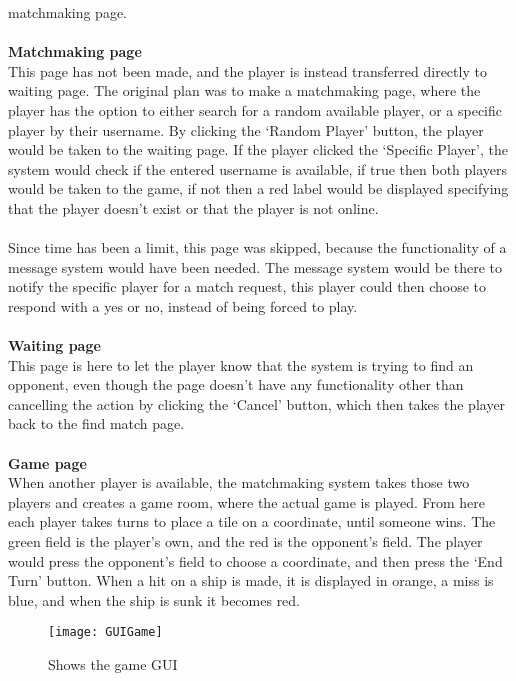 		  matchmaking page.
\\
\\
\textbf{Matchmaking page}
\\
This page has not been made, and the player is instead transferred directly
 to waiting page. The original plan was to make a matchmaking page, where the
  player has the option to either search for a random available player, or a
	 specific player by their username. By clicking the ‘Random Player’ button,
	  the player would be taken to the waiting page. If the player clicked the
		‘Specific Player’, the system would check if the entered username is
		available, if true then both players would be taken to the game, if not
		 then a red label would be displayed specifying that the player doesn’t
		 exist or that the player is not online.
\\
\\
Since time has been a limit, this page was skipped, because the functionality
of a message system would have been needed. The message system would be there
 to notify the specific player for a match request, this player could then
 choose to respond with a yes or no, instead of being forced to play.
\\
\\
\textbf{Waiting page}
\\
This page is here to let the player know that the system is trying to find
an opponent, even though the page doesn’t have any functionality other than
 cancelling the action by clicking the ‘Cancel’ button, which then takes the
  player back to the find match page.
\\
\\
\textbf{Game page}
\\
When another player is available, the matchmaking system takes those two
 players and creates a game room, where the actual game is played. From here
  each player takes turns to place a tile on a coordinate, until someone wins.
	 The green field is the player's own, and the red is the opponent’s field.
	 The player would press the opponent's field to choose a coordinate, and then
	  press the ‘End Turn’ button. When a hit on a ship is made, it is displayed
		 in orange, a miss is blue, and when the ship is sunk it becomes red.
\begin{figure}[h]
	\centerline{\texttt{[image: GUIGame]}}
	\caption{Shows the game GUI}
\end{figure}
\\
